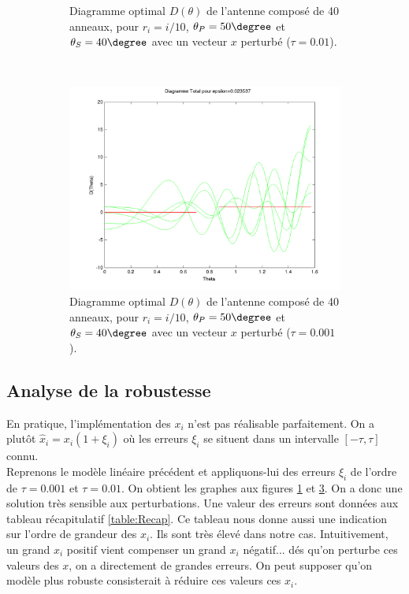 \begin{figure}[h!]
\begin{subfigure}[b]{0.32\textwidth}
  \caption{Diagramme optimal $D(\theta)$ de l'antenne composé de 40 anneaux, pour $r_i=i/10$, $\theta_P=50 \degree$ et $\theta_S=40 \degree$ avec un vecteur $x$ perturbé ($\tau = 0.01$).}
  \label{fig:D-ModLin-RobustTau01}
  \end{subfigure}
   ~ 
  \begin{subfigure}[b]{0.32\textwidth}
  \includegraphics[width=1.1\textwidth]{D-ModLin-2RobustTau001.png}
  \caption{Diagramme optimal $D(\theta)$ de l'antenne composé de 40 anneaux, pour $r_i=i/10$, $\theta_P=50 \degree$ et $\theta_S=40 \degree$ avec un vecteur $x$ perturbé ($\tau=0.001$).}
  \label{fig:D-ModLin-RobustTau001}
  \end{subfigure}
  \caption{}
  \end{figure}


\subsection{Analyse de la robustesse}
En pratique, l'implémentation des $x_i$ n'est pas réalisable parfaitement. On a plutôt $\hat{x}_i = x_i(1+\xi_i)$ où les erreurs $\xi_i$ se situent dans un intervalle $[-\tau,\tau]$ connu.\\
Reprenons le modèle linéaire précédent et appliquons-lui des erreurs $\xi_i$ de l'ordre de $\tau=0.001$ et $\tau=0.01$. On obtient les graphes aux figures \ref{fig:D-ModLin-RobustTau01} et \ref{fig:D-ModLin-RobustTau001}. On a donc une solution très sensible aux perturbations. Une valeur des erreurs sont données aux tableau récapitulatif \ref{table:Recap}. Ce tableau nous donne aussi une indication sur l'ordre de grandeur des $x_i$. Ils sont très élevé dans notre cas. Intuitivement, un grand $x_i$ positif vient compenser un grand $x_i$ négatif... dés qu'on perturbe ces valeurs des $x$, on a directement de grandes erreurs. On peut supposer qu'on modèle plus robuste consisterait à réduire ces valeurs ces $x_i$.









